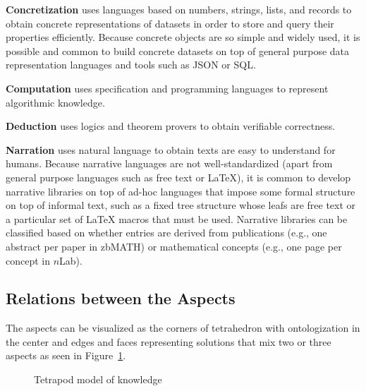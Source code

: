 \textbf{Concretization} uses languages based on numbers, strings, lists, and records to obtain concrete representations of datasets in order to store and query their properties efficiently.
Because concrete objects are so simple and widely used, it is possible and common to build concrete datasets on top of general purpose data representation languages and tools such as JSON or SQL.

\textbf{Computation} uses specification and programming languages to represent algorithmic knowledge.

\textbf{Deduction} uses logics and theorem provers  to obtain verifiable correctness.

\textbf{Narration} uses natural language to obtain texts are easy to understand for humans.
Because narrative languages are not well-standardized (apart from general purpose languages such as free text or \LaTeX), it is common to develop narrative libraries on top of ad-hoc languages that impose some formal structure on top of informal text, such as a fixed tree structure whose leafs are free text or a particular set of {\LaTeX} macros that must be used.
Narrative libraries can be classified based on whether entries are derived from publications (e.g., one abstract per paper in zbMATH) or mathematical concepts (e.g., one page per concept in $n$Lab).



\subsection{Relations between the Aspects}

The aspects can be visualized as the corners of tetrahedron with ontologization in the center and edges and faces representing solutions that mix two or three aspects as seen in Figure~\ref{fig:tetrapod}.

\begin{figure}[hbt]
\begin{center}
\end{center}
\caption{Tetrapod model of knowledge}\label{fig:tetrapod}
\end{figure}

